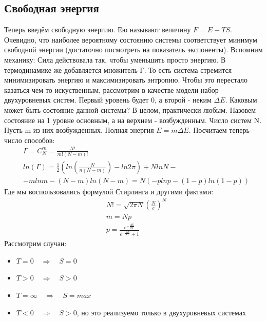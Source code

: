 \documentclass[a4paper, 12pt]{article}
\newcommand{\qrq}
{\ensuremath{\quad \Rightarrow \quad}} %
\begin{document}
	\subsection{Свободная энергия}
	Теперь введём свободную энергию. Ею называют величину $F =E-TS$. Очевидно, что наиболее вероятному состоянию системы соответствует минимум свободной энергии (достаточно посмотреть на показатель экспоненты). Вспомним механику: Сила действовала так, чтобы уменьшить просто энергию. В термодинамике же добавляется множитель Г. То есть система стремится минимизировать энергию и максимизировать энтропию. Чтобы это перестало казаться чем-то искуственным, рассмотрим в качестве модели набор двухуровневых систем. Первый уровень будет 0, а второй - неким $\Delta E$.  Каковым может быть состояние данной системы? В целом, практически любым. Назовем состояние на 1 уровне основным, а на верхнем - возбужденным. Число систем N. Пусть m из них возбужденных. Полная энергия $E = m \Delta E$. Посчитаем теперь число способов:
	\begin{equation*}
		\begin{aligned}
			& \Gamma = C_{N}^{m} = \frac{N!}{m!(N-m)!}                           \\
			& ln(\Gamma) = \frac{1}{2 }(ln(\frac{N}{n(N-m)})- ln 2 \pi) + NlnN - \\
			& - mlnm - (N-m)ln(N-m) = N( -plnp - (1-p)ln(1-p))                   
		\end{aligned}
	\end{equation*}
	Где мы воспользовались формулой Стирлинга  и другими фактами:
	\begin{equation*}
		\begin{aligned}
			& N!=\sqrt{2 \pi N}(\frac{N}{e})^{N}                                \\
			& \overline{m} = Np                                                 \\
			& p = \frac{e^{-\frac{\Delta E}{kT}}}{e^{-\frac{\Delta E}{kT}} + 1} 
		\end{aligned}
	\end{equation*}
	Рассмотрим случаи:
	\begin{itemize}
		\item $T = 0 \qrq S = 0$
		\item $ T > 0 \qrq S>0$
		\item $T = \infty \qrq S = max$
		\item $T<0 \qrq S>0$, но это реализуемо только в двухуровневых системах
	\end{itemize}
\end{document}
